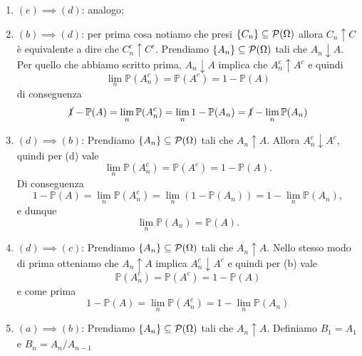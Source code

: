 \documentclass[a4paper]{article}
\begin{document}
\begin{snippetproof}{}
\begin{enumerate}
\[            \]
            e di conseguenza \[
                \lim_n \mathbb P(A_n) = 1 - \mathbb P(A^c) = \mathbb P(A)
            \]
        \item \emph{\((e) \implies (d)\)}: analogo;
        \item \emph{\((b) \implies (d)\)}:
            per prima cosa notiamo che presi \(\{C_n\} \subseteq \mathcal P(\Omega)\)
            allora \(C_n \uparrow C\) è equivalente a dire che \(C_n^c \uparrow C^c\).
            Prendiamo \(\{A_n\} \subseteq \mathcal P(\Omega)\)
            tali che \(A_n \downarrow A\).
            Per quello che abbiamo scritto prima,
            \(A_n \downarrow A\) implica che \(A_n^c \uparrow A^c\) e quindi
            \[
                \lim_n \mathbb P(A_n^c) = \mathbb P(A^c) = 1 - \mathbb P(A)
            \]
            di conseguenza
            \[
                \cancel{1}
                - \mathbb P(A)
                = \lim_n \mathbb P(A_n^c)
                = \lim_n 1 - \mathbb P(A_n)
                = \cancel{1} - \lim_n \mathbb P(A_n)
            \]
        \item \emph{\((d) \implies (b)\)}: Prendiamo \(\{A_n\} \subseteq \mathcal P(\Omega)\)
            tali che \(A_n \uparrow A\).
            Allora \(A_n^c \downarrow A^c\), quindi per (d) vale
            \[
                \lim_n \mathbb P(A_n^c) = \mathbb P(A^c) = 1-\mathbb P(A).
            \]
            Di conseguenza
            \[
                1-\mathbb P(A)
                = \lim_n \mathbb P(A_n^c)
                = \lim_n \left(1-\mathbb P(A_n)\right)
                = 1-\lim_n \mathbb P(A_n),
            \]
            e dunque
            \[
                \lim_n \mathbb P(A_n) = \mathbb P(A).
            \]
        \item \emph{\((d) \implies (c)\)}:
            Prendiamo \(\{A_n\} \subseteq \mathcal P(\Omega)\)
            tali che \(A_n \uparrow A\).
            Nello stesso modo di prima otteniamo
            che \(A_n \uparrow A\) implica \(A_n^c \downarrow A^c\)
            e quindi per (b) vale
            \[
                \mathbb P(A_n^c) = \mathbb P(A^c) = 1-\mathbb P(A)
            \]
            e come prima
            \[
                1 - \mathbb P(A)
                = \lim_n \mathbb P(A_n^c)
                = 1- \lim_n \mathbb P(A_n)
            \]
        \item \emph{\((a) \implies (b)\)}:
            Prendiamo \(\{A_n\} \subseteq \mathcal P(\Omega)\)
            tali che \(A_n \uparrow A\).
            Definiamo \(B_1 = A_1\) e \(B_n = A_n / A_{n-1}\)

\end{enumerate}
\end{snippetproof}
\end{document}
